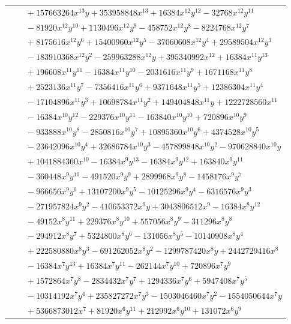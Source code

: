 \documentclass[11pt]{article}
\begin{document}
\begin{longtable}{@{}ll@{}}
 & $\quad +157663264x^{13}y+353958848x^{13}+16384x^{12}y^{12}-32768x^{12}y^{11}$\\
 & $\quad -81920x^{12}y^{10}+1130496x^{12}y^{9}-458752x^{12}y^{8}-8224768x^{12}y^{7}$\\
 & $\quad +8175616x^{12}y^{6}+15400960x^{12}y^{5}-37060608x^{12}y^{4}+29589504x^{12}y^{3}$\\
 & $\quad -183910368x^{12}y^{2}-259963288x^{12}y+395340992x^{12}+16384x^{11}y^{13}$\\
 & $\quad +196608x^{11}y^{11}-16384x^{11}y^{10}-2031616x^{11}y^{9}+1671168x^{11}y^{8}$\\
 & $\quad +2523136x^{11}y^{7}-7356416x^{11}y^{6}+9371648x^{11}y^{5}+12386304x^{11}y^{4}$\\
 & $\quad -17104896x^{11}y^{3}+10698784x^{11}y^{2}+149404848x^{11}y+1222728560x^{11}$\\
 & $\quad -16384x^{10}y^{12}-229376x^{10}y^{11}-163840x^{10}y^{10}+720896x^{10}y^{9}$\\
 & $\quad -933888x^{10}y^{8}-2850816x^{10}y^{7}+10895360x^{10}y^{6}+4374528x^{10}y^{5}$\\
 & $\quad -23642096x^{10}y^{4}+32686784x^{10}y^{3}-457899848x^{10}y^{2}-970628840x^{10}y$\\
 & $\quad +1041884360x^{10}-16384x^{9}y^{13}-16384x^{9}y^{12}+163840x^{9}y^{11}$\\
 & $\quad -360448x^{9}y^{10}-491520x^{9}y^{9}+2899968x^{9}y^{8}-1458176x^{9}y^{7}$\\
 & $\quad -966656x^{9}y^{6}+13107200x^{9}y^{5}-10125296x^{9}y^{4}-6316576x^{9}y^{3}$\\
 & $\quad -271957824x^{9}y^{2}-410653372x^{9}y+3043806512x^{9}-16384x^{8}y^{12}$\\
 & $\quad -49152x^{8}y^{11}+229376x^{8}y^{10}+557056x^{8}y^{9}-311296x^{8}y^{8}$\\
 & $\quad -294912x^{8}y^{7}+5324800x^{8}y^{6}-131056x^{8}y^{5}-10140908x^{8}y^{4}$\\
 & $\quad +222580880x^{8}y^{3}-691262052x^{8}y^{2}-1299787420x^{8}y+2442729416x^{8}$\\
 & $\quad -16384x^{7}y^{13}+16384x^{7}y^{11}-262144x^{7}y^{10}+720896x^{7}y^{9}$\\
 & $\quad +1572864x^{7}y^{8}-2834432x^{7}y^{7}+1294336x^{7}y^{6}+5947408x^{7}y^{5}$\\
 & $\quad -10314192x^{7}y^{4}+235827272x^{7}y^{3}-1503046460x^{7}y^{2}-1554050644x^{7}y$\\
 & $\quad +5366873012x^{7}+81920x^{6}y^{11}+212992x^{6}y^{10}+131072x^{6}y^{9}$\\

\end{longtable}
\end{document}
